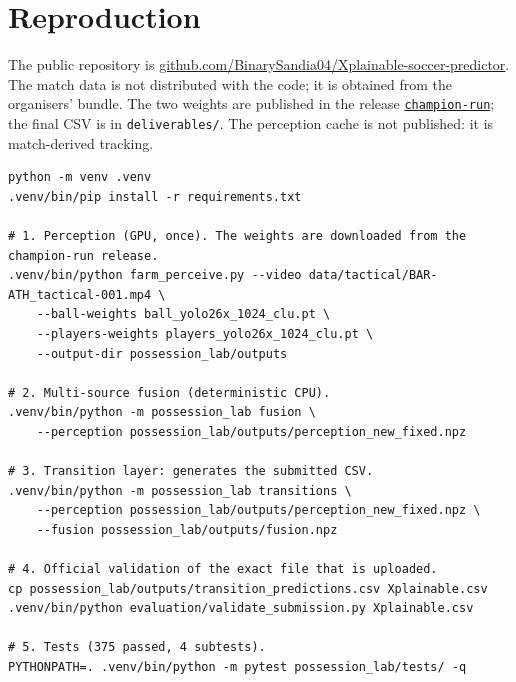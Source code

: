 \documentclass[10pt,a4paper]{article}
\begin{document}
\section{Reproduction}

The public repository is
\href{https://github.com/BinarySandia04/Xplainable-soccer-predictor}{github.com/BinarySandia04/Xplainable-soccer-predictor}.
The match data is not distributed with the code; it is obtained from the organisers' bundle.
The two weights are published in the release
\href{https://github.com/BinarySandia04/Xplainable-soccer-predictor/releases/tag/champion-run}{\texttt{champion-run}};
the final CSV is in \texttt{deliverables/}. The perception cache is not published: it is
match-derived tracking.

\begin{lstlisting}
python -m venv .venv
.venv/bin/pip install -r requirements.txt

# 1. Perception (GPU, once). The weights are downloaded from the champion-run release.
.venv/bin/python farm_perceive.py --video data/tactical/BAR-ATH_tactical-001.mp4 \
    --ball-weights ball_yolo26x_1024_clu.pt \
    --players-weights players_yolo26x_1024_clu.pt \
    --output-dir possession_lab/outputs

# 2. Multi-source fusion (deterministic CPU).
.venv/bin/python -m possession_lab fusion \
    --perception possession_lab/outputs/perception_new_fixed.npz

# 3. Transition layer: generates the submitted CSV.
.venv/bin/python -m possession_lab transitions \
    --perception possession_lab/outputs/perception_new_fixed.npz \
    --fusion possession_lab/outputs/fusion.npz

# 4. Official validation of the exact file that is uploaded.
cp possession_lab/outputs/transition_predictions.csv Xplainable.csv
.venv/bin/python evaluation/validate_submission.py Xplainable.csv

# 5. Tests (375 passed, 4 subtests).
PYTHONPATH=. .venv/bin/python -m pytest possession_lab/tests/ -q
\end{lstlisting}
\end{document}
